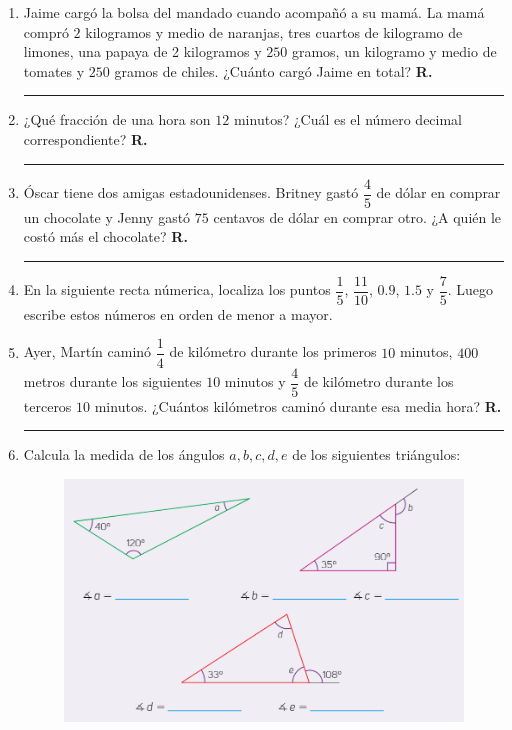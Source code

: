 \begin{enumerate}
\item Jaime cargó la bolsa del mandado cuando acompañó a su mamá. La mamá compró $2$ kilogramos y medio de naranjas, tres cuartos de kilogramo de limones, una papaya de 2 kilogramos y $250$ gramos, un kilogramo y medio de tomates y $250$ gramos de chiles. ¿Cuánto cargó Jaime en total? \hspace{0.3cm} \textbf{R.} \rule{3cm}{0.1mm}
\item ¿Qué fracción de una hora son $12$ minutos? ¿Cuál es el número decimal correspondiente? \hspace{0.3cm} \textbf{R.} \rule{3cm}{0.1mm}
\item Óscar tiene dos amigas estadounidenses. Britney gastó $\dfrac{4}{5}$ de dólar en comprar un chocolate y Jenny gastó $75$ centavos de dólar en comprar otro. ¿A quién le costó más el chocolate? \hspace{0.3cm} \textbf{R.} \rule{3cm}{0.1mm}
\item En la siguiente recta númerica, localiza los puntos $\dfrac{1}{5}$, $\dfrac{11}{10}$, $0.9$, $1.5$ y $\dfrac{7}{5}$. Luego escribe estos números en orden de menor a mayor.
\begin{figure}[H]
    \centering
\end{figure}
\vspace{0.5cm}
\item Ayer, Martín caminó $\dfrac{1}{4}$ de kilómetro durante los primeros $10$ minutos, $400$ metros durante los siguientes $10$ minutos y $\dfrac{4}{5}$ de kilómetro durante los terceros $10$ minutos. ¿Cuántos kilómetros caminó durante esa media hora? \hspace{0.3cm} \textbf{R.} \rule{3cm}{0.1mm}
\item Calcula la medida de los ángulos $a, b, c, d, e$ de los siguientes triángulos:
\begin{figure}[H]
  \centering
  \includegraphics[scale=0.65]{Imagenes/Angulos_01.png}

\end{figure}
\end{enumerate}
